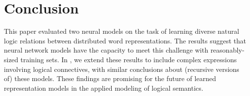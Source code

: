 \section{Conclusion}\label{sec:discussion}

This paper evaluated two neural models on the task of learning diverse
natural logic relations between distributed word representations. The
results suggest that neural network models have the capacity to
meet this challenge with reasonably-sized training sets. In
\cite{Bowman:Potts:Manning:2014}, we extend these results to include
complex expressions involving logical connectives, with similar
conclusions about (recursive versions of) these models. These findings
are promising for the future of learned representation models in the
applied modeling of logical semantics.

%
%
%


